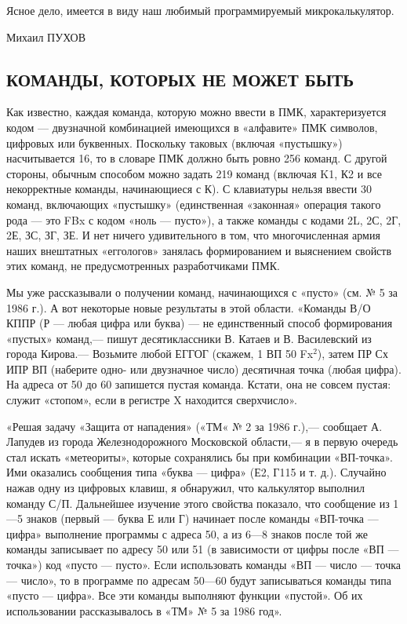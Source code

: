 \documentclass[11pt,a4paper,oneside]{article}
\begin{document}
Ясное дело, имеется в виду наш любимый программируемый микрокалькулятор.

Михаил ПУХОВ

\subsection{КОМАНДЫ, КОТОРЫХ НЕ МОЖЕТ БЫТЬ}
Как известно, каждая команда, которую можно ввести в ПМК, характеризуется кодом — двузначной комбинацией имеющихся в «алфавите» ПМК символов, цифровых или буквенных. Поскольку таковых (включая «пустышку») насчитывается 16, то в словаре ПМК должно быть ровно 256 команд. С другой стороны, обычным способом можно задать 219 команд (включая K1, К2 и все некорректные команды, начинающиеся с К). С клавиатуры нельзя ввести 30 команд, включающих «пустышку» (единственная «законная» операция такого рода — это FBx с кодом «ноль — пусто»), а также команды с кодами 2L, 2С, 2Г, 2Е, ЗС, ЗГ, ЗЕ. И нет ничего удивительного в том, что многочисленная армия наших внештатных «еггологов» занялась формированием и выяснением свойств этих команд, не предусмотренных разработчиками ПМК.

Мы уже рассказывали о получении команд, начинающихся с «пусто» (см. № 5 за 1986 г.). А вот некоторые новые результаты в этой области.
«Команды В/О КППР (Р — любая цифра или буква) — не единственный способ формирования «пустых» команд,— пишут десятиклассники В. Катаев и В. Василевский из города Кирова.— Возьмите любой ЕГГОГ (скажем, 1 ВП 50 Fx$^{2}$), затем ПР Сх ИПР ВП (наберите одно- или двузначное число) десятичная точка (любая цифра). На адреса от 50 до 60 запишется пустая команда. Кстати, она не совсем пустая: служит «стопом», если в регистре X находится сверхчисло».

«Решая задачу «Защита от нападения» («ТМ« № 2 за 1986 г.),— сообщает А. Лапудев из города Железнодорожного Московской области,— я в первую очередь стал искать «метеориты», которые сохранялись бы при комбинации «ВП-точка». Ими оказались сообщения типа «буква — цифра» (Е2, Г115 и т. д.). Случайно нажав одну из цифровых клавиш, я обнаружил, что калькулятор выполнил команду С/П. Дальнейшее изучение этого свойства показало, что сообщение из 1—5 знаков (первый — буква Е или Г) начинает после команды «ВП-точка — цифра» выполнение программы с адреса 50, а из 6—8 знаков после той же команды записывает по адресу 50 или 51 (в зависимости от цифры после «ВП — точка») код «пусто — пусто». Если использовать команды «ВП — число — точка — число», то в программе по адресам 50—60 будут записываться команды типа «пусто — цифра». Все эти команды выполняют функции «пустой». Об их использовании рассказывалось в «ТМ» № 5 за 1986 год».
\end{document}
